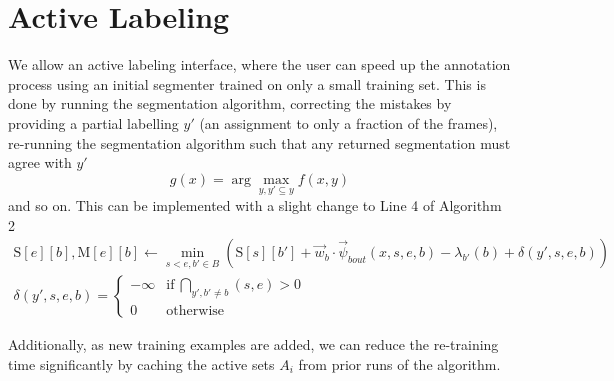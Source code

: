 \documentclass[10pt, onecolumn]{article}
\newcommand{\1}{\textbf{1}}
\begin{document}
\section{Active Labeling}

We allow an active labeling interface, where the user can speed up the annotation process using an initial segmenter trained on only a small training set.  This is done by running the segmentation algorithm, correcting the mistakes by providing a partial labelling $y'$ (an assignment to only a fraction of the frames), re-running the segmentation algorithm such that any returned segmentation must agree with $y'$
\begin{equation}
g(x) = \arg\max_{y, y' \subseteq y} f(x,y)
\label{eq:active_labelling}
\end{equation}
and so on.  This can be implemented with a slight change to Line 4 of Algorithm 2
\begin{eqnarray}
 \mathrm{S}[e][b],\mathrm{M}[e][b] \gets \min\limits_{s<e,b' \in B} \left( \mathrm{S}[s][b'] + \vec{w}_b \cdot \vec{\psi}_{bout}(x,s,e,b) - \lambda_{b'}(b) + \delta(y',s,e,b) \right) \\
 \delta(y',s,e,b) = \left\{ \begin{array}{ll}  -\infty & \mathrm{if\ }\bigcap\limits_{y',b' \ne b} (s,e) > 0\\0 & \mathrm{otherwise} \end{array} \right.
\end{eqnarray}

Additionally, as new training examples are added, we can reduce the re-training time significantly by caching the active sets $A_i$ from prior runs of the algorithm.
\end{document}
